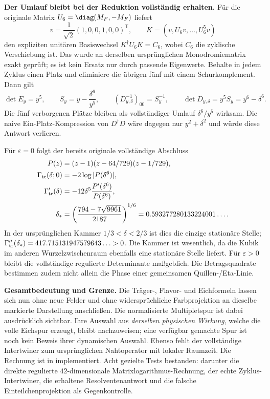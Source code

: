 \textbf{Der Umlauf bleibt bei der Reduktion vollständig erhalten.}
Für die originale Matrix $U_6=\diag(M_F,-M_F)$ liefert
\[
v=\frac1{\sqrt2}(1,0,0,1,0,0)^{\mathsf T},\qquad
K=(v,U_6v,\ldots,U_6^5v)
\]
den expliziten unitären Basiswechsel $K^\dagger U_6K=C_6$, wobei $C_6$ die zyklische Verschiebung ist.
Das wurde an derselben ursprünglichen Monodromiematrix exakt geprüft; es ist kein Ersatz nur durch passende Eigenwerte.
Behalte in jedem Zyklus einen Platz und eliminiere die übrigen fünf mit einem Schurkomplement. Dann gilt
\begin{equation}\label{eq:flavorschur}
\det E_y=y^5,\qquad
S_y=y-\frac{\delta^6}{y^5},\qquad
(D_{y,\delta}^{-1})_{00}=S_y^{-1},\qquad
\det D_{y,\delta}=y^5S_y=y^6-\delta^6.
\end{equation}
Die fünf verborgenen Plätze bleiben als vollständiger Umlauf $\delta^6/y^5$ wirksam.
Die naive Ein-Platz-Kompression von $D^\dagger D$ wäre dagegen nur $y^2+\delta^2$ und würde diese Antwort verlieren.

Für $\varepsilon=0$ folgt der bereits originale vollständige Abschluss
\begin{align}
P(z)&=(z-1)(z-64/729)(z-1/729),\\
\Gamma_{\rm tr}(\delta;0)&=-2\log|P(\delta^6)|,\\
\Gamma_{\rm tr}'(\delta)&=-12\delta^5\frac{P'(\delta^6)}{P(\delta^6)},\\
\delta_*&=\left(\frac{794-7\sqrt{9961}}{2187}\right)^{1/6}
=0.593277280133224001\ldots .
\end{align}
In der ursprünglichen Kammer $1/3<\delta<2/3$ ist dies die einzige stationäre Stelle;
$\Gamma_{\rm tr}''(\delta_*)=417.715131947579643\ldots>0$.
Die Kammer ist wesentlich, da die Kubik im anderen Wurzelzwischenraum ebenfalls eine stationäre Stelle liefert.
Für $\varepsilon>0$ bleibt die vollständige regulierte Determinante maßgeblich.
Die Betragsquadrate bestimmen zudem nicht allein die Phase einer gemeinsamen Quillen-/Eta-Linie.


\textbf{Gesamtbedeutung und Grenze.} Die Träger-, Flavor- und Eichformeln lassen sich nun ohne neue Felder und ohne widersprüchliche Farbprojektion an dieselbe markierte Darstellung anschließen.
Die normalisierte Multipletspur ist dabei ausdrücklich sichtbar. Ihre Auswahl aus \emph{derselben physischen Wirkung}, welche die volle Eichspur erzeugt, bleibt nachzuweisen; eine verfügbar gemachte Spur ist noch kein Beweis ihrer dynamischen Auswahl.
Ebenso fehlt der vollständige Intertwiner zum ursprünglichen Nahtoperator mit lokaler Raumzeit.
Die Rechnung ist in  implementiert. Acht gezielte Tests bestanden: darunter die direkte regulierte $42$-dimensionale Matrixlogarithmus-Rechnung, der echte Zyklus-Intertwiner, die erhaltene Resolventenantwort und die falsche Einteilchenprojektion als Gegenkontrolle.

